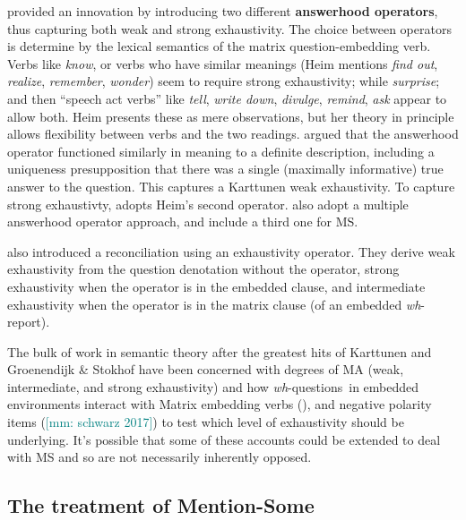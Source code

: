 \documentclass[12pt,letterpaper,table,svgnames,dvipsnames]{article}
\newcommand{\mm}[1]{\textcolor{teal}{[mm: #1]}}
\newcommand{\whqs}{\emph{wh}-questions~}
\begin{document}
 provided an innovation by introducing two different \textbf{answerhood operators}, thus capturing both weak and strong exhaustivity. The choice between operators is determine by the lexical semantics of the matrix question-embedding verb. Verbs like \emph{know}, or verbs who have similar meanings (Heim mentions \emph{find out}, \emph{realize}, \emph{remember}, \emph{wonder}) seem to require strong exhaustivity; while \emph{surprise}; and then ``speech act verbs'' like \emph{tell}, \emph{write down}, \emph{divulge}, \emph{remind}, \emph{ask} appear to allow both. Heim presents these as mere observations, but her theory in principle allows flexibility between verbs and the two readings.  argued that the answerhood operator functioned similarly in meaning to a definite description, including a uniqueness presupposition that there was a single (maximally informative) true answer to the question. This captures a Karttunen weak exhaustivity. To capture strong exhaustivty, \cite{dayal2016} adopts Heim's second operator.  also adopt a multiple answerhood operator approach, and include a third one for MS.

 also introduced a reconciliation using an exhaustivity operator. They derive weak exhaustivity from the question denotation without the operator, strong exhaustivity when the operator is in the embedded clause, and intermediate exhaustivity when the operator is in the matrix clause (of an embedded \emph{wh}-report). 

The bulk of work in semantic theory after the greatest hits of Karttunen and Groenendijk \& Stokhof have been concerned with degrees of MA (weak, intermediate, and strong exhaustivity) and how \whqs in embedded environments interact with Matrix embedding verbs (\cite{heim1994,beckrull1999,sharvit2002,lahiri2002,specegr2015,uegaki2014,uegaki2015,theiler2014,theiroealo2016}), and negative polarity items (\cite{guerzshar2007,sharvit2002,nicolae2014,vanrooij2003}\mm{schwarz 2017}) to test which level of exhaustivity should be underlying. It's possible that some of these accounts could be extended to deal with MS and so are not necessarily inherently opposed. 


\subsection{The treatment of Mention-Some}
\end{document}
